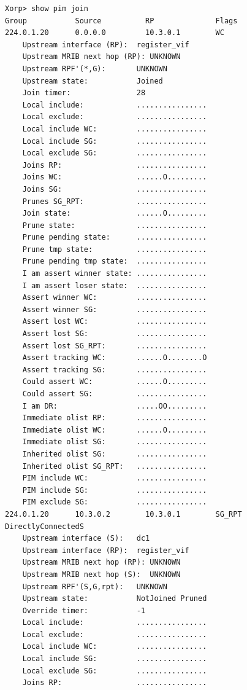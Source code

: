\documentclass[11pt]{report}
\begin{document}
\begin{itemize}
\begin{verbatim}
Xorp> show pim join 
Group           Source          RP              Flags
224.0.1.20      0.0.0.0         10.3.0.1        WC   
    Upstream interface (RP):  register_vif
    Upstream MRIB next hop (RP): UNKNOWN
    Upstream RPF'(*,G):       UNKNOWN
    Upstream state:           Joined 
    Join timer:               28
    Local include:            ................
    Local exclude:            ................
    Local include WC:         ................
    Local include SG:         ................
    Local exclude SG:         ................
    Joins RP:                 ................
    Joins WC:                 ......O.........
    Joins SG:                 ................
    Prunes SG_RPT:            ................
    Join state:               ......O.........
    Prune state:              ................
    Prune pending state:      ................
    Prune tmp state:          ................
    Prune pending tmp state:  ................
    I am assert winner state: ................
    I am assert loser state:  ................
    Assert winner WC:         ................
    Assert winner SG:         ................
    Assert lost WC:           ................
    Assert lost SG:           ................
    Assert lost SG_RPT:       ................
    Assert tracking WC:       ......O........O
    Assert tracking SG:       ................
    Could assert WC:          ......O.........
    Could assert SG:          ................
    I am DR:                  .....OO.........
    Immediate olist RP:       ................
    Immediate olist WC:       ......O.........
    Immediate olist SG:       ................
    Inherited olist SG:       ................
    Inherited olist SG_RPT:   ................
    PIM include WC:           ................
    PIM include SG:           ................
    PIM exclude SG:           ................
224.0.1.20      10.3.0.2        10.3.0.1        SG_RPT DirectlyConnectedS 
    Upstream interface (S):   dc1
    Upstream interface (RP):  register_vif
    Upstream MRIB next hop (RP): UNKNOWN
    Upstream MRIB next hop (S):  UNKNOWN
    Upstream RPF'(S,G,rpt):   UNKNOWN
    Upstream state:           NotJoined Pruned 
    Override timer:           -1
    Local include:            ................
    Local exclude:            ................
    Local include WC:         ................
    Local include SG:         ................
    Local exclude SG:         ................
    Joins RP:                 ................

\end{verbatim}
\end{itemize}
\end{document}
